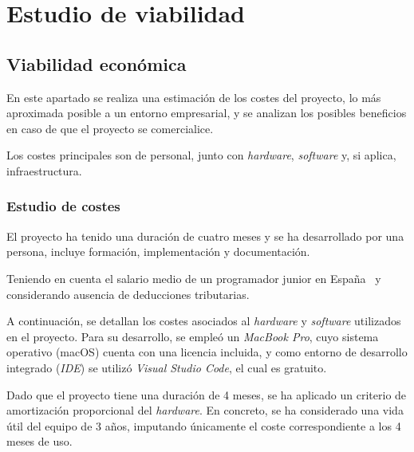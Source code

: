 \section{Estudio de viabilidad}

\subsection{Viabilidad económica}

En este apartado se realiza una estimación de los costes del proyecto, lo más aproximada posible a un entorno empresarial, y se analizan los posibles beneficios en caso de que el proyecto se comercialice.

Los costes principales son de personal, junto con \textit{hardware}, \textit{software} y, si aplica, infraestructura.

\subsubsection{Estudio de costes}

El proyecto ha tenido una duración de cuatro meses y se ha desarrollado por una persona, incluye formación, 
implementación y documentación. 

Teniendo en cuenta el salario medio de un programador junior en España~\cite{web:talen} y 
considerando ausencia de deducciones tributarias.


A continuación, se detallan los costes asociados al \textit{hardware} y \textit{software} utilizados en el proyecto. Para su desarrollo, 
se empleó un \textit{MacBook Pro}, cuyo sistema operativo (macOS) cuenta con una licencia incluida, y como entorno de desarrollo integrado (\textit{IDE}) 
se utilizó \textit{Visual Studio Code}, el cual es gratuito.

Dado que el proyecto tiene una duración de 4 meses, se ha aplicado un criterio de amortización proporcional del \textit{hardware}. En concreto, se ha considerado una vida útil del equipo de 3 años, imputando únicamente el coste correspondiente a los 4 meses de uso.

